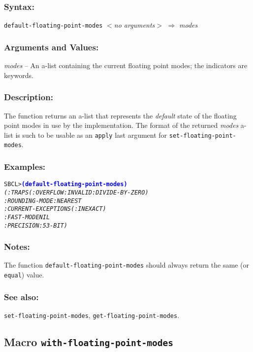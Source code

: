 \documentclass[fleqn]{article}
\newcommand{\code}[1]{\texttt{#1}}
\newcommand{\varname}[1]{\textit{#1}}
\newcommand{\codeprompt}[1]{\textcolor{blue}{\textbf{#1}}}
\newcommand{\DDictionaryItem}[1]{\vspace*{6pt}\noindent\hrulefill\vspace*{-9pt}\subsection*{#1}}
\begin{document}
\subsubsection*{Syntax:}

\code{default-floating-point-modes} \textit{$<$no arguments$>$}
$\Rightarrow$ \varname{modes}

\subsubsection*{Arguments and Values:}

\varname{modes} -- An a-list containing the current floating
point modes; the indicators are keywords.

\subsubsection*{Description:}

The function returns an a-list that represents the \emph{default}
state of the floating point modes in use by the implementation.  The
format of the returned \varname{modes} a-list is such to be usable as
an \code{apply} last argument for \code{set-floating-point-modes}.

\subsubsection*{Examples:}

\begin{alltt}
SBCL> \codeprompt{(default-floating-point-modes)}
\textit{(:TRAPS (:OVERFLOW :INVALID :DIVIDE-BY-ZERO)
 :ROUNDING-MODE :NEAREST
 :CURRENT-EXCEPTIONS (:INEXACT)
 :FAST-MODE NIL
 :PRECISION :53-BIT)}
\end{alltt}

\subsubsection*{Notes:}

The function \code{default-floating-point-modes} should always return
the same (or \code{equal}) value.

\subsubsection*{See also:}

\code{set-floating-point-modes}, \code{get-floating-point-modes}.


\newpage
\DDictionaryItem{Macro \code{with-floating-point-modes}}
\end{document}
